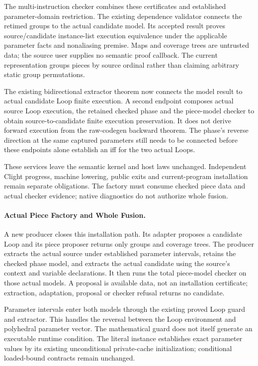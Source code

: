 The multi-instruction checker combines these certificates and established
parameter-domain restriction. The existing dependence validator connects the
retimed groups to the actual candidate model. Its accepted result proves
source/candidate instance-list execution equivalence under the applicable
parameter facts and nonaliasing premise. Maps and coverage trees are untrusted
data; the source user supplies no semantic proof callback. The current
representation groups pieces by source ordinal rather than claiming arbitrary
static group permutations.

The existing bidirectional extractor theorem now connects the model result
to actual candidate Loop finite execution. A second endpoint composes actual
source Loop execution, the retained checked phase and the piece-model checker
to obtain source-to-candidate finite execution preservation. It does not
derive forward execution from the raw-codegen backward theorem. The phase's
reverse direction at the same captured parameters still needs to be connected
before these endpoints alone establish an iff for the two actual Loops.

These services leave the semantic kernel and host laws unchanged. Independent
Clight progress, machine lowering, public exits and current-program installation
remain separate obligations. The factory must consume checked piece data and
actual checker evidence; native diagnostics do not authorize whole fusion.

\paragraph{Actual Piece Factory and Whole Fusion.}
A new producer closes this installation path. Its adapter proposes a candidate
Loop and its piece proposer returns only groups and coverage trees. The producer
extracts the actual source under established parameter intervals, retains the
checked phase model, and extracts the actual candidate using the source's context
and variable declarations. It then runs the total piece-model checker on those
actual models. A proposal is available data, not an installation certificate;
extraction, adaptation, proposal or checker refusal returns no candidate.

Parameter intervals enter both models through the existing proved Loop guard
and extractor. This handles the reversal between the Loop environment and
polyhedral parameter vector. The mathematical guard does not itself generate
an executable runtime condition. The literal instance establishes exact
parameter values by its existing unconditional private-cache initialization;
conditional loaded-bound contracts remain unchanged.

